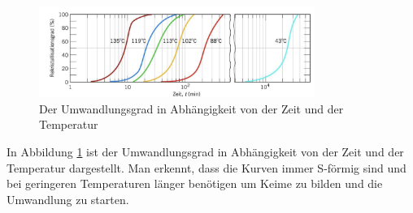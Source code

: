 \documentclass[11pt,a4paper]{article}
\numberwithin{equation}{section}
\numberwithin{figure}{section}
\begin{document}
\\
\begin{addmargin}[25pt]{0pt}
\begin{figure}[h]
    \centering
    \includegraphics[width = 0.8\textwidth]{images/Materialwissenschaften/Umwandlungsgrad.jpeg}
    \caption{Der Umwandlungsgrad in Abhängigkeit von der Zeit und der Temperatur}
    \label{fig:Umwandlungsgrad}
\end{figure}
In Abbildung \ref{fig:Umwandlungsgrad} ist der Umwandlungsgrad in Abhängigkeit von der Zeit und der Temperatur dargestellt. Man erkennt, dass die Kurven immer S-förmig sind und bei geringeren Temperaturen länger benötigen um Keime zu bilden und die Umwandlung zu starten. \\
\end{addmargin}
\end{document}
